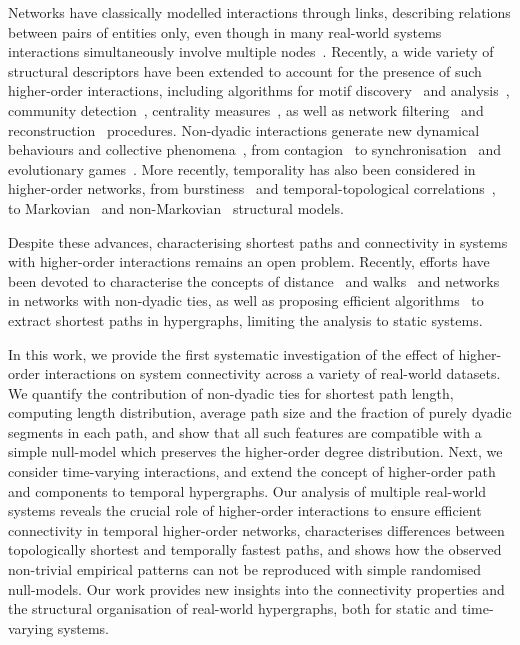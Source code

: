 \documentclass[a4paper,pre,reqno,superscriptaddress, twocolumn, floatfix]{revtex4}
\def\ho{higher-order }
\begin{document}
Networks have classically modelled interactions through links, describing relations between pairs of entities only, even though in many real-world systems interactions simultaneously involve multiple nodes~\cite{battiston2020honetworks}. 
Recently, a wide variety of structural descriptors have been extended to account for the presence of such \ho interactions, including algorithms for motif discovery~\cite{lotito2022homotifs} and analysis~\cite{mann2021randomgraphs}, community detection~\cite{eriksson2022flow, ruggeri2023community}, centrality measures~\cite{benson2019three}, as well as network filtering~\cite{musciotto2021detecting} and reconstruction~\cite{young2021hypergraph} procedures. Non-dyadic interactions generate new dynamical behaviours and collective phenomena~\cite{battiston2021physics, bick2023higher}, from contagion~\cite{iacopini2019simplicial, dearruda2020social} to synchronisation~\cite{skardal2020higher, millan2020explosive, zhang2023higher} and evolutionary games~\cite{alvarez2021evolutionary, civilini2024explosive}. More recently, temporality has also been considered in \ho networks, from burstiness~\cite{cencetti2021temporal} and temporal-topological correlations~\cite{ceria2023temporal}, to Markovian~\cite{petri2018simplicial, digaet2024percolation} and non-Markovian~\cite{gallo2024higher, iacopini2024temporal} structural models.  


Despite these advances, characterising shortest paths and connectivity in systems with \ho interactions remains an open problem. Recently, efforts have been devoted to characterise the concepts of distance~\cite{vasilyeva2023distancesho} and walks~\cite{aksoy2020hypernetwork} and networks in networks with non-dyadic ties, as well as proposing efficient algorithms~\cite{gao2014hoshortestpath} to extract shortest paths in hypergraphs, limiting the analysis to static systems. 

In this work, we provide the first systematic investigation of the effect of \ho interactions on system connectivity across a variety of real-world datasets. 
We quantify the contribution of non-dyadic ties for shortest path length, computing length distribution, average path size and the fraction of purely dyadic segments in each path, and show that all such features are compatible with a simple null-model which preserves the \ho degree distribution. 
Next, we consider time-varying interactions, and extend the concept of \ho path and components to temporal hypergraphs. 
Our analysis of multiple real-world systems reveals the crucial role of \ho interactions to ensure efficient connectivity in temporal \ho networks, characterises differences between topologically shortest and temporally fastest paths, and shows how the observed non-trivial empirical patterns can not be reproduced with simple randomised null-models. Our work provides new insights into the connectivity properties and the structural organisation of real-world hypergraphs, both for static and time-varying systems.
\end{document}
